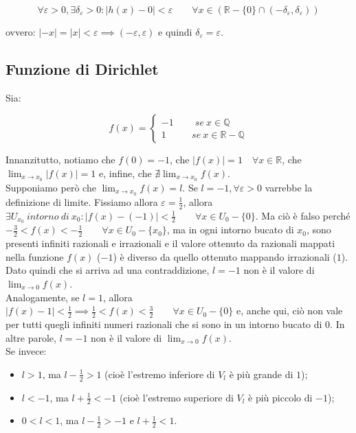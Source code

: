 \documentclass{article}
\begin{document}
\begin{equation*}
    \forall \varepsilon > 0, \exists \delta_\varepsilon > 0 : |h(x) - 0| < \varepsilon \qquad \forall x \in (\mathbb{R} - \{0\} \cap (-\delta_\varepsilon, \delta_\varepsilon))
\end{equation*}

\noindent ovvero: $|-x| = |x| < \varepsilon \implies (-\varepsilon, \varepsilon)$ e quindi $\delta_\varepsilon = \varepsilon$.\\

\subsection{Funzione di Dirichlet}
Sia:

\begin{equation*}
    f(x) = 
    \begin{cases}
        -1 \qquad \ se \ x \in \mathbb{Q} \\
        1 \qquad \ \ \ se \ x \in \mathbb{R - Q}
    \end{cases}
\end{equation*}

\noindent Innanzitutto, notiamo che $f(0) = -1$, che $|f(x)| = 1 \quad \forall x \in \mathbb{R}$, che $\lim_{x \to x_0} |f(x)| = 1$ e, infine, che $\nexists \lim_{x \to x_0} f(x)$.\\
Supponiamo però che $\lim_{x \to x_0} f(x) = l$. Se $l = -1, \forall \varepsilon > 0$ varrebbe la definizione di limite. Fissiamo allora $\varepsilon = \frac{1}{2}$, allora $\exists U_{x_0} \ intorno \ di \ x_0 : |f(x) - (-1)| < \frac{1}{2} \qquad \forall x \in U_0 - \{0\}$. Ma ciò è falso perché $-\frac{3}{2} < f(x) < -\frac{1}{2} \qquad \forall x \in U_0 - \{x_0\}$, ma in ogni intorno bucato di $x_0$, sono presenti infiniti razionali e irrazionali e il valore ottenuto da razionali mappati nella funzione $f(x)$ ($-1$) è diverso da quello ottenuto mappando irrazionali ($1$). Dato quindi che si arriva ad una contraddizione, $l = -1$ non è il valore di $\lim_{x \to 0} f(x)$.\\
Analogamente, se $l = 1$, allora $|f(x) - 1| < \frac{1}{2} \implies \frac{1}{2} < f(x) < \frac{3}{2} \qquad \forall x \in U_0 - \{0\}$ e, anche qui, ciò non vale per tutti quegli infiniti numeri razionali che si sono in un intorno bucato di $0$. In altre parole, $l = -1$ non è il valore di $\lim_{x \to 0} f(x)$.\\
Se invece:

\begin{itemize}
    \item $l > 1$, ma $l - \frac{1}{2} > 1$ (cioè l'estremo inferiore di $V_l$ è più grande di $1$);
    \item $l < -1$, ma $l + \frac{1}{2} < -1$ (cioè l'estremo superiore di $V_l$ è più piccolo di $-1$);
    \item $0 < l < 1$, ma $l - \frac{1}{2} > - 1$ e $l + \frac{1}{2} < 1$.
\end{itemize}
\end{document}
